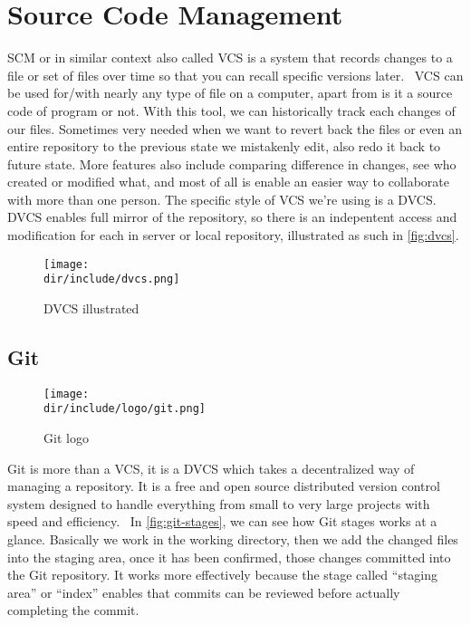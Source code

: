 \section{Source Code Management}
\label{sec:scm}

\ac{SCM} or in similar context also called \ac{VCS} is a system that records changes to a file or set of files over time so that you can recall specific versions later.~\autocite{Chacon:2014:ProGit:27}
\ac{VCS} can be used for/with nearly any type of file on a computer, apart from is it a source code of program or not.
With this tool, we can historically track each changes of our files.
Sometimes very needed when we want to revert back the files or even an entire repository to the previous state we mistakenly edit, also redo it back to future state.
More features also include comparing difference in changes, see who created or modified what, and most of all is enable an easier way to collaborate with more than one person.
The specific style of \ac{VCS} we're using is a \ac{DVCS}.
\ac{DVCS} enables full mirror of the repository, so there is an indepentent access and modification for each in server or local repository, illustrated as such in \autoref{fig:dvcs}.

\begin{figure}[htb]
    \centering
    \texttt{[image: \\dir/include/dvcs.png]}
    \caption[DVCS illustrated]{DVCS illustrated}
    \label{fig:dvcs}
\end{figure}

\clearpage

\subsection{Git}

\begin{wrapfigure}{r}{0.5\textwidth}
  \vspace{-20pt}
  \begin{center}
    \texttt{[image: \\dir/include/logo/git.png]}
  \end{center}
  \vspace{-20pt}
  \caption{Git logo}
  \label{fig:git-logo}
  \vspace{-10pt}
\end{wrapfigure}

Git is more than a \ac{VCS}, it is a \ac{DVCS} which takes a decentralized way of managing a repository.
It is a free and open source distributed version control system designed to handle everything from small to very large projects with speed and efficiency.~\autocite{Git2010}
In \autoref{fig:git-stages}, we can see how Git stages works at a glance.
Basically we work in the working directory, then we add the changed files into the staging area, once it has been confirmed, those changes committed into the Git repository.
It works more effectively because the stage called ``staging area'' or ``index'' enables that commits can be reviewed before actually completing the commit.

